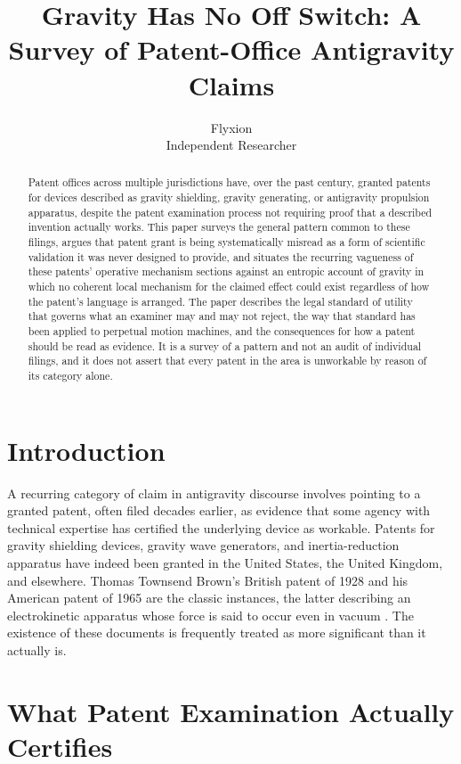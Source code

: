 \documentclass[11pt]{article}
\title{Gravity Has No Off Switch: A Survey of Patent-Office Antigravity Claims}
\author{Flyxion \\ \small Independent Researcher}
\date{}
\begin{document}
\maketitle

\begin{abstract}
Patent offices across multiple jurisdictions have, over the past century, granted patents for devices described as gravity shielding, gravity generating, or antigravity propulsion apparatus, despite the patent examination process not requiring proof that a described invention actually works. This paper surveys the general pattern common to these filings, argues that patent grant is being systematically misread as a form of scientific validation it was never designed to provide, and situates the recurring vagueness of these patents' operative mechanism sections against an entropic account of gravity in which no coherent local mechanism for the claimed effect could exist regardless of how the patent's language is arranged. The paper describes the legal standard of utility that governs what an examiner may and may not reject, the way that standard has been applied to perpetual motion machines, and the consequences for how a patent should be read as evidence. It is a survey of a pattern and not an audit of individual filings, and it does not assert that every patent in the area is unworkable by reason of its category alone.
\end{abstract}

\section{Introduction}

A recurring category of claim in antigravity discourse involves pointing to a granted patent, often filed decades earlier, as evidence that some agency with technical expertise has certified the underlying device as workable. Patents for gravity shielding devices, gravity wave generators, and inertia-reduction apparatus have indeed been granted in the United States, the United Kingdom, and elsewhere. Thomas Townsend Brown's British patent of 1928 and his American patent of 1965 are the classic instances, the latter describing an electrokinetic apparatus whose force is said to occur even in vacuum \cite{Brown1928,Brown1965}. The existence of these documents is frequently treated as more significant than it actually is.

\section{What Patent Examination Actually Certifies}
\end{document}
